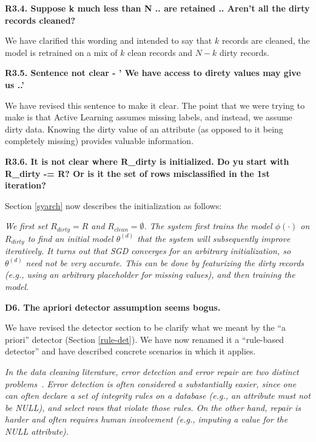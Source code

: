\vspace{0.5em}

\noindent \textbf{R3.4. Suppose k much less than N .. are retained .. Aren't all
the dirty records cleaned?}

\noindent  We have clarified this wording and intended to say that $k$ records are cleaned, the model is retrained on a mix of $k$ clean records and $N-k$ dirty records.

\vspace{0.5em}

\noindent\textbf{R3.5. Sentence not clear - ' We have access to direty
values may give us ..'}

 \noindent We have revised this sentence to make it clear. The point that we were trying to make is that Active Learning assumes missing labels, and instead, we assume dirty data. Knowing the dirty value of an attribute (as opposed to it being completely missing) provides valuable information.

\vspace{0.5em}

\noindent\textbf{R3.6. It is not clear where R\_dirty is initialized. Do yu start with R\_dirty -= R? Or is it the set of rows misclassified in the 1st iteration?}

\noindent Section \ref{syarch} now describes the initialization as follows:

\emph{We first set $R_{dirty} = R$ and $R_{clean} = \emptyset$.
The system first trains the model $\phi(\cdot)$ on $R_{dirty}$ to find an initial model $\theta^{(d)}$ that the system will subsequently improve iteratively.
It turns out that SGD converges for an arbitrary initialization, so $\theta^{(d)}$ need not be very accurate. This can be done by featurizing the dirty records (e.g., using an arbitrary placeholder for missing values), and then training the model.}

\vspace{0.5em}

\noindent\textbf{D6. The apriori detector assumption seems bogus.} 

\noindent  We have revised the detector section to be clarify what we meant by the ``a priori'' detector (Section \ref{rule-det}). We have now renamed it a ``rule-based detector'' and have described concrete scenarios in which it applies.

\vspace{0.5em}

\emph{In the data cleaning literature, error detection and error repair are two distinct problems~\cite{DBLP:series/synthesis/2012Fan, Dasu:2003:EDM:861869, rahm2000data}.
Error detection is often considered a substantially easier, since one can often declare a set of integrity rules on a database (e.g., an attribute must not be NULL), and select rows that violate those rules.
On the other hand, repair is harder and often requires human involvement (e.g., imputing a value for the NULL attribute).}

